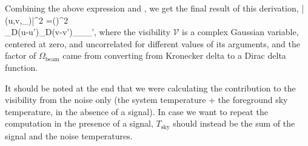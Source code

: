 Combining the above expression and \eq{\ref{eq:var_rho}}, we get the final result of this derivation,
\beq
\bga
\langle|(u,v,\theta_\nu)|^2\rangle 
=\left(\right)^2\\
\times\delta_D(u-u')\delta_D(v-v')\delta_{\theta_\nu\theta_{\nu'}},
\ega
\label{eq:Vrms_final}
\eeq
where the visibility $\mathcal{V}$ is a complex Gaussian variable, centered at zero, and uncorrelated for different values of its arguments, and the factor of $\Omega_\text{beam}$ came from converting from Kronecker delta to a  Dirac delta function.

It should be noted at the end that we were calculating the contribution to the visibility from the noise only (the system temperature + the foreground sky temperature, in the absence of a signal). In case we want to repeat the computation in the presence of a signal, $T_\text{sky}$ should instead be the sum of the signal and the noise temperatures.
